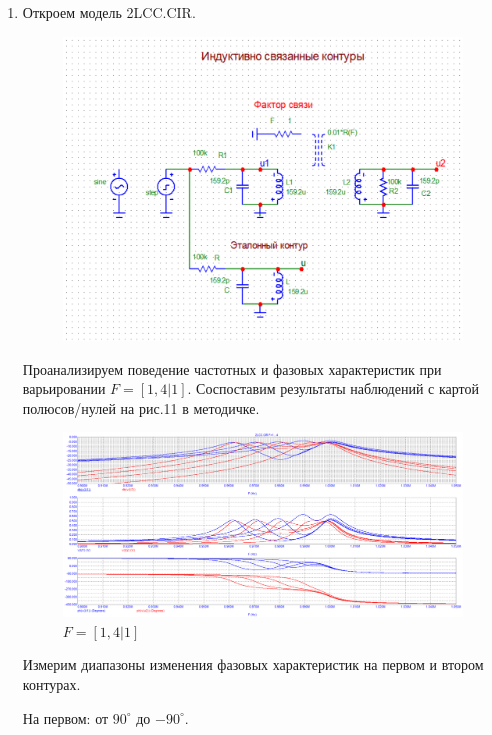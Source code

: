 \documentclass[a4paper, 14pt]{article}%
\begin{document}
\begin{enumerate}

\item Откроем модель 2LCC.CIR. 

\begin{figure}[h!]
\centering
\includegraphics[scale = 0.7]{images/2LCM.png}
\label{fig:Image1}
\end{figure}

Проанализируем поведение частотных и фазовых характеристик при варьировании $F = [1,4|1]$. Соспоставим результаты наблюдений с картой полюсов/нулей на рис.11 в методичке.

\begin{figure}[h!]
\centering
\includegraphics[scale = 0.4]{images/plot2-1_1.png}
\caption{$F = [1,4|1]$}
\label{fig:Image1}
\end{figure}

Измерим диапазоны изменения фазовых характеристик на первом и втором контурах.

На первом: от $90^{\circ}$ до $-90^{\circ}$.


\end{enumerate}
\end{document}
